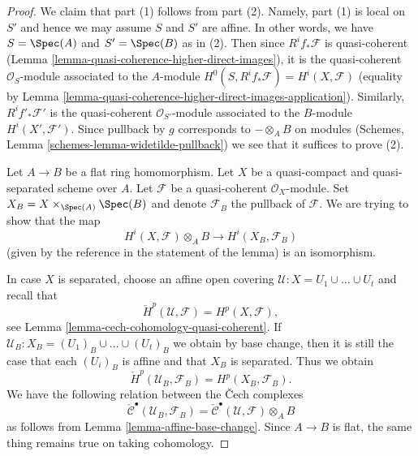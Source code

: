 \begin{proof}
We claim that part (1) follows from part (2). Namely,
part (1) is local on $S'$ and hence we may assume $S$
and $S'$ are affine. In other words, we have $S = \Spec(A)$
and $S' = \Spec(B)$ as in (2).
Then since $R^if_*\mathcal{F}$ is quasi-coherent
(Lemma \ref{lemma-quasi-coherence-higher-direct-images}),
it is the quasi-coherent $\mathcal{O}_S$-module associated to the
$A$-module $H^0(S, R^if_*\mathcal{F}) = H^i(X, \mathcal{F})$
(equality by
Lemma \ref{lemma-quasi-coherence-higher-direct-images-application}).
Similarly, $R^if'_*\mathcal{F}'$ is the quasi-coherent
$\mathcal{O}_{S'}$-module associated to the $B$-module
$H^i(X', \mathcal{F}')$. Since pullback by $g$ corresponds
to $- \otimes_A B$ on modules
(Schemes, Lemma \ref{schemes-lemma-widetilde-pullback})
we see that it suffices to prove (2).

\medskip\noindent
Let $A \to B$ be a flat ring homomorphism.
Let $X$ be a quasi-compact and quasi-separated scheme over $A$.
Let $\mathcal{F}$ be a quasi-coherent $\mathcal{O}_X$-module.
Set $X_B = X \times_{\Spec(A)} \Spec(B)$ and denote
$\mathcal{F}_B$ the pullback of $\mathcal{F}$.
We are trying to show that the map
$$
H^i(X, \mathcal{F}) \otimes_A B \longrightarrow H^i(X_B, \mathcal{F}_B)
$$
(given by the reference in the statement of the lemma)
is an isomorphism.

\medskip\noindent
In case $X$ is separated, choose an affine open covering
$\mathcal{U} : X = U_1 \cup \ldots \cup U_t$ and recall that
$$
\check{H}^p(\mathcal{U}, \mathcal{F}) = H^p(X, \mathcal{F}),
$$
see
Lemma \ref{lemma-cech-cohomology-quasi-coherent}.
If $\mathcal{U}_B : X_B = (U_1)_B \cup \ldots \cup (U_t)_B$ we obtain
by base change, then it is still the case that each $(U_i)_B$ is affine
and that $X_B$ is separated. Thus we obtain
$$
\check{H}^p(\mathcal{U}_B, \mathcal{F}_B) = H^p(X_B, \mathcal{F}_B).
$$
We have the following relation between the {\v C}ech complexes
$$
\check{\mathcal{C}}^\bullet(\mathcal{U}_B, \mathcal{F}_B) =
\check{\mathcal{C}}^\bullet(\mathcal{U}, \mathcal{F}) \otimes_A B
$$
as follows from
Lemma \ref{lemma-affine-base-change}.
Since $A \to B$ is flat, the same thing remains true on taking cohomology.


\end{proof}
